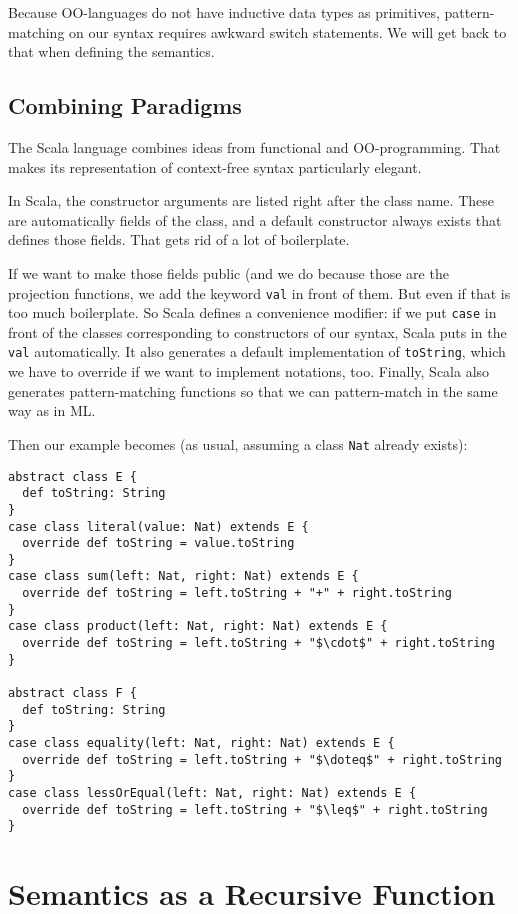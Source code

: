 Because OO-languages do not have inductive data types as primitives, pattern-matching on our syntax requires awkward switch statements.
We will get back to that when defining the semantics.

\subsection{Combining Paradigms}

The Scala language combines ideas from functional and OO-programming.
That makes its representation of context-free syntax particularly elegant.

In Scala, the constructor arguments are listed right after the class name.
These are automatically fields of the class, and a default constructor always exists that defines those fields.
That gets rid of a lot of boilerplate.

If we want to make those fields public (and we do because those are the projection functions, we add the keyword \texttt{val} in front of them.
But even if that is too much boilerplate. So Scala defines a convenience modifier: if we put \texttt{case} in front of the classes corresponding to constructors of our syntax, Scala puts in the \texttt{val} automatically.
It also generates a default implementation of \texttt{toString}, which we have to override if we want to implement notations, too.
Finally, Scala also generates pattern-matching functions so that we can pattern-match in the same way as in ML.

Then our example becomes (as usual, assuming a class \texttt{Nat} already exists):

\begin{lstlisting}
abstract class E {
  def toString: String
}
case class literal(value: Nat) extends E {
  override def toString = value.toString
}
case class sum(left: Nat, right: Nat) extends E {
  override def toString = left.toString + "+" + right.toString
}
case class product(left: Nat, right: Nat) extends E {
  override def toString = left.toString + "$\cdot$" + right.toString
}

abstract class F {
  def toString: String
}
case class equality(left: Nat, right: Nat) extends E {
  override def toString = left.toString + "$\doteq$" + right.toString
}
case class lessOrEqual(left: Nat, right: Nat) extends E {
  override def toString = left.toString + "$\leq$" + right.toString
}
\end{lstlisting}

\section{Semantics as a Recursive Function}


